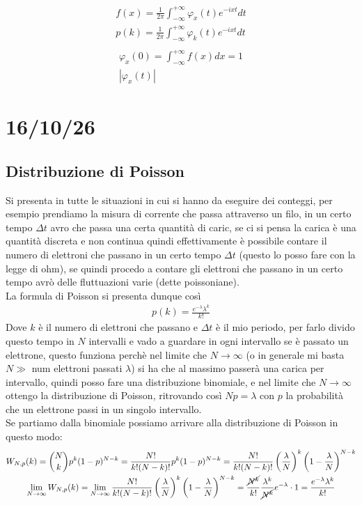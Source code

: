 \documentclass[a4paper, oneside]{article}
\begin{document}
\begin{gather*}
    f(x) = \frac{1}{2\pi} \int_{-\infty}^{+\infty} \varphi_x(t) e^{-ixt} dt\\
    p(k) = \frac{1}{2\pi} \int_{-\infty}^{+\infty} \varphi_k(t) e^{-ixt} dt\\
\end{gather*}
\begin{gather*}
    \varphi_x(0) = \int_{-\infty}^{+\infty} f(x) dx = 1\\
    |\varphi_x(t)|
\end{gather*}


\section{16/10/26}
\subsection{Distribuzione di Poisson}
Si presenta in tutte le situazioni in cui si hanno da eseguire dei conteggi, per esempio prendiamo la misura di corrente che passa attraverso un filo, in un certo tempo $\Delta t$ avro che passa una certa quantità di caric, se ci si pensa la carica è una quantità discreta e non continua quindi effettivamente è possibile contare il numero di elettroni che passano in un certo tempo $\Delta t$ (questo lo posso fare con la legge di ohm), se quindi procedo a contare gli elettroni che passano in un certo tempo avrò delle fluttuazioni varie (dette poissoniane).\\
La formula di Poisson si presenta dunque così
\begin{gather*}
    p(k) = \frac{e^{-\lambda} \lambda^k}{k!}
\end{gather*}
Dove $k$ è il numero di elettroni che passano e $\Delta t$ è il mio periodo, per farlo divido questo tempo in $N$ intervalli e vado a guardare in ogni intervallo se è passato un elettrone, questo funziona perchè nel limite che $N \to \infty$ (o in generale mi basta $N\gg $ num elettroni passati $\lambda$) si ha che al massimo passerà una carica per intervallo, quindi posso fare una distribuzione binomiale, e nel limite che $N \to \infty$ ottengo la distribuzione di Poisson, ritrovando così $N p = \lambda$ con $p$ la probabilità che un elettrone passi in un singolo intervallo.\\
Se partiamo dalla binomiale possiamo arrivare alla distribuzione di Poisson in questo modo:
\begin{gather*}
    W_{N,p}(k) = \binom{N}{k} p^k (1-p)^{N-k} = \frac{N!}{k!(N-k)!} p^k (1-p)^{N-k} = \frac{N!}{k!(N-k)!} \left( \frac{\lambda}{N} \right)^k \left( 1 - \frac{\lambda}{N} \right)^{N-k}\\
    \lim_{N \to \infty} W_{N,p}(k) = \lim_{N \to \infty} \frac{N!}{k!(N-k)!} \left( \frac{\lambda}{N} \right)^k \left( 1 - \frac{\lambda}{N} \right)^{N-k} = \frac{\cancel{N^k}}{k!} \frac{\lambda^k}{\cancel{N^k}} e^{-\lambda} \cdot 1 = \frac{e^{-\lambda} \lambda^k}{k!}
\end{gather*}
\end{document}
